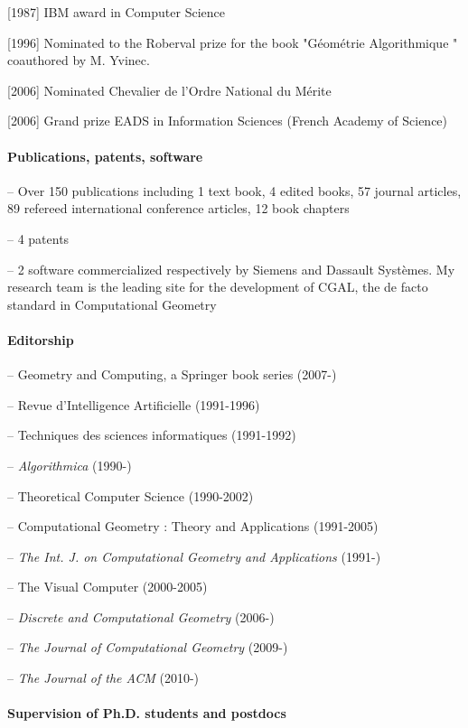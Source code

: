 [1987] IBM award in Computer Science 

[1996] Nominated to the  Roberval prize for the book "G\'eom\'etrie Algorithmique " coauthored by M. Yvinec.

[2006] Nominated Chevalier de l'Ordre National du M\'erite

[2006] Grand prize EADS in Information Sciences (French Academy of Science)

\paragraph{Publications, patents, software} \mbox{}

-- Over 150 publications including 1 text book, 4 edited books, 57 journal articles, 89 refereed international conference articles, 12 book chapters

-- 4 patents

-- 2 software commercialized respectively by Siemens and Dassault Syst\`emes. My research team is the leading site for the development of CGAL, the de facto standard  in Computational Geometry

\paragraph{Editorship} \mbox{}

-- Geometry and Computing, a Springer book series (2007-)

--  Revue d'Intelligence Artificielle (1991-1996)

--  Techniques des sciences informatiques (1991-1992)

-- {\em Algorithmica} (1990-)

--  Theoretical Computer Science (1990-2002)

-- Computational Geometry : Theory and Applications (1991-2005)

-- {\em The Int. J. on Computational Geometry and Applications} (1991-)

--  The Visual Computer (2000-2005)

-- {\em Discrete and Computational Geometry } (2006-)

-- {\em The Journal of Computational Geometry} (2009-)

-- {\em The Journal of the ACM }(2010-)

\paragraph{Supervision of Ph.D. students and postdocs} \mbox{}


